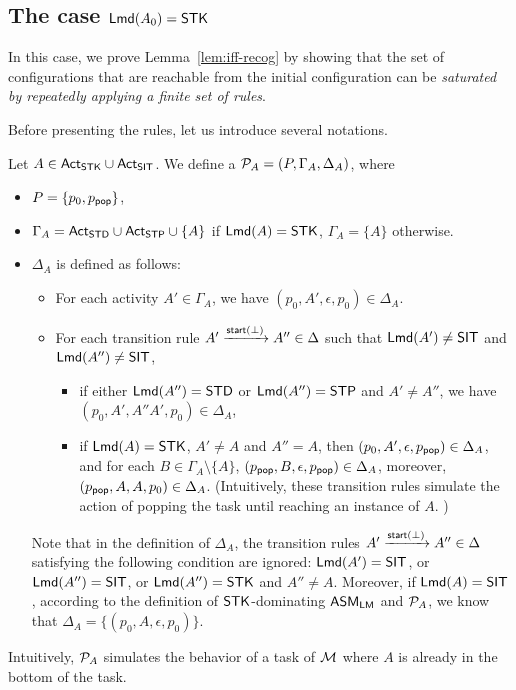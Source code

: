 

\subsection{The case ${\sf Lmd}(A_0) = \mathsf{STK}$}\label{sec:lmamass-stk}

In this case, we prove Lemma~\ref{lem:iff-recog} by showing that the set of configurations that are reachable from the initial configuration can be \emph{saturated by repeatedly applying a finite set of rules}. 

Before presenting the rules, let us introduce several notations. 

Let $A \in {\sf Act}_{\sf STK}\cup{\sf Act}_{{\sf SIT}}$. 
We define a {\PDS} ${\mathcal{P} }_{A} = (P, \Gamma_{A}, \Delta_{A})$, where 
\begin{itemize}
\item $P = \{p_0, p_{\mathsf{pop}}\}$, 
\item $\Gamma_{A} = {\sf Act}_{{\sf STD}}\cup{\sf Act}_{{\sf STP}}\cup\{A\}$ if ${\sf Lmd}(A) = {\sf STK}$, $\Gamma_{A} = \{A\}$ otherwise.
\item $\Delta_{A}$ is defined as follows: 
\begin{itemize}
%
\item For each activity $A' \in \Gamma_A $, we have $(p_0, A', \epsilon, p_0) \in \Delta_{A}$.
%
\item For each transition rule $A' \xrightarrow{{\mathsf{start} }(\bot)} A'' \in \Delta$ such that ${\sf Lmd}(A') \neq {\sf SIT}$ and ${\sf Lmd}(A'') \neq  {\sf SIT}$, 
\begin{itemize}
    \item if either ${\sf Lmd}(A'') = \mathsf{STD}$ or ${\sf Lmd}(A'') = {\sf STP}$ and $A' \neq A''$, we have $(p_0, A', A''A', p_0) \in \Delta_{A}$,    
    \item if ${\sf Lmd}(A) = {\sf STK}$, $A' \neq A$ and $A'' = A$, then $(p_0, A', \epsilon, p_{\mathsf{pop}}) \in \Delta_{A}$, and for each $B \in \Gamma_{A} \setminus \{A\}$, $(p_{\mathsf{pop}}, B, \epsilon, p_{\mathsf{pop}}) \in \Delta_{A}$, moreover, $(p_{\mathsf{pop}}, A, A, p_0) \in \Delta_{A}$. (Intuitively, these transition rules simulate the action of popping the task until reaching an instance of $A$. )
\end{itemize}
\end{itemize}
Note that in the definition of $\Delta_{A}$, the transition rules $A' \xrightarrow{{\mathsf{start} }(\bot)} A'' \in \Delta$ satisfying the following condition are ignored: ${\sf Lmd}(A') = {\sf SIT}$, or ${\sf Lmd}(A'') = {\sf SIT}$, or ${\sf Lmd}(A'') = {\sf STK}$ and $A'' \neq A$. 
Moreover, if ${\sf Lmd}(A) = {\sf SIT}$, according to the definition of $\mathsf{STK}$-dominating $\textsf{ASM}_\textsf{LM}$ and ${\mathcal{P} }_A$, we know that $\Delta_A = \{(p_0,A,\epsilon,p_0)\}$.
\end{itemize}
Intuitively, ${\mathcal{P} }_{A}$ simulates the behavior of a task of ${\mathcal{M} }$ where $A$ is already in the bottom of the task. 



